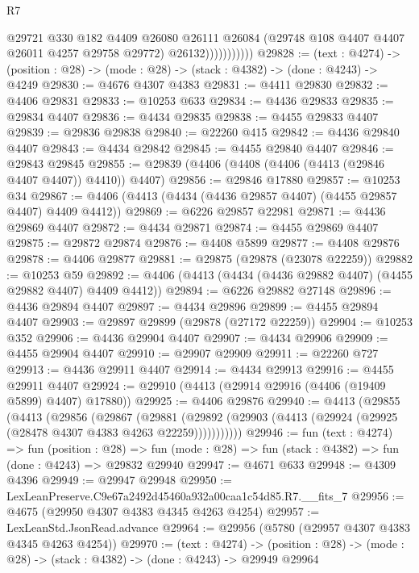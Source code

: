 \begin{lexlean}{R7}
\begin{coremodule}
                        @29721
                          @330
                          @182
                          @4409
                          @26080
                          @26111
                          @26084
                          (@29748 @108 @4407 @4407 @26011 @4257 @29758 @29772)
                          @26132)))))))))))
@29828 := (text : @4274) ->
  (position : @28) -> (mode : @28) -> (stack : @4382) -> (done : @4243) -> @4249
@29830 := @4676 @4307 @4383
@29831 := @4411 @29830
@29832 := @4406 @29831
@29833 := @10253 @633
@29834 := @4436 @29833
@29835 := @29834 @4407
@29836 := @4434 @29835
@29838 := @4455 @29833 @4407
@29839 := @29836 @29838
@29840 := @22260 @415
@29842 := @4436 @29840 @4407
@29843 := @4434 @29842
@29845 := @4455 @29840 @4407
@29846 := @29843 @29845
@29855 := @29839 (@4406 (@4408 (@4406 (@4413 (@29846 @4407 @4407)) @4410)) @4407)
@29856 := @29846 @17880
@29857 := @10253 @34
@29867 := @4406 (@4413 (@4434 (@4436 @29857 @4407) (@4455 @29857 @4407) @4409 @4412))
@29869 := @6226 @29857 @22981
@29871 := @4436 @29869 @4407
@29872 := @4434 @29871
@29874 := @4455 @29869 @4407
@29875 := @29872 @29874
@29876 := @4408 @5899
@29877 := @4408 @29876
@29878 := @4406 @29877
@29881 := @29875 (@29878 (@23078 @22259))
@29882 := @10253 @59
@29892 := @4406 (@4413 (@4434 (@4436 @29882 @4407) (@4455 @29882 @4407) @4409 @4412))
@29894 := @6226 @29882 @27148
@29896 := @4436 @29894 @4407
@29897 := @4434 @29896
@29899 := @4455 @29894 @4407
@29903 := @29897 @29899 (@29878 (@27172 @22259))
@29904 := @10253 @352
@29906 := @4436 @29904 @4407
@29907 := @4434 @29906
@29909 := @4455 @29904 @4407
@29910 := @29907 @29909
@29911 := @22260 @727
@29913 := @4436 @29911 @4407
@29914 := @4434 @29913
@29916 := @4455 @29911 @4407
@29924 := @29910 (@4413 (@29914 @29916 (@4406 (@19409 @5899) @4407) @17880))
@29925 := @4406 @29876
@29940 := @4413
    (@29855
      (@4413
        (@29856
          (@29867
            (@29881
              (@29892 (@29903 (@4413 (@29924 (@29925 (@28478 @4307 @4383 @4263 @22259)))))))))))
@29946 := fun (text : @4274) =>
  fun (position : @28) =>
  fun (mode : @28) => fun (stack : @4382) => fun (done : @4243) => @29832 @29940
@29947 := @4671 @633
@29948 := @4309 @4396
@29949 := @29947 @29948
@29950 := LexLeanPreserve.C9e67a2492d45460a932a00caa1c54d85.R7.__fits_7
@29956 := @4675 (@29950 @4307 @4383 @4345 @4263 @4254)
@29957 := LexLeanStd.JsonRead.advance
@29964 := @29956 (@5780 (@29957 @4307 @4383 @4345 @4263 @4254))
@29970 := (text : @4274) ->
  (position : @28) -> (mode : @28) -> (stack : @4382) -> (done : @4243) -> @29949 @29964

\end{coremodule}
\end{lexlean}
